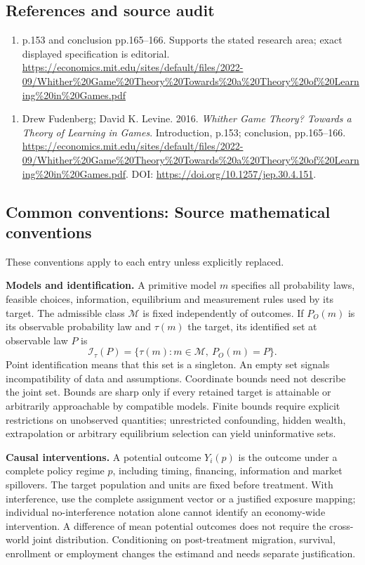 \documentclass[11pt,a4paper]{article}
\begin{document}
\subsection*{References and source audit}
\begin{enumerate}
\item p.153 and conclusion pp.165–166. Supports the stated research area; exact displayed specification is editorial. \url{https://economics.mit.edu/sites/default/files/2022-09/Whither%20Game%20Theory%20Towards%20a%20Theory%20of%20Learning%20in%20Games.pdf}
\end{enumerate}
\begin{enumerate}\raggedright
\item\hypertarget{definitions:source:30007565:1}{} Drew Fudenberg; David K. Levine. 2016. \emph{Whither Game Theory? Towards a Theory of Learning in Games}. Introduction, p.153; conclusion, pp.165–166.
\url{https://economics.mit.edu/sites/default/files/2022-09/Whither%20Game%20Theory%20Towards%20a%20Theory%20of%20Learning%20in%20Games.pdf}.
DOI: \url{https://doi.org/10.1257/jep.30.4.151}.
\end{enumerate}

\subsection*{Common conventions: Source mathematical conventions}

These conventions apply to each entry unless explicitly replaced.

\textbf{Models and identification.} A primitive model \(m\) specifies all probability laws, feasible choices, information, equilibrium and measurement rules used by its target. The admissible class \(\mathcal M\) is fixed independently of outcomes. If \(P_O(m)\) is its observable probability law and \(\tau(m)\) the target, its identified set at observable law \(P\) is
\[
 \mathcal I_\tau(P)=\{\tau(m):m\in\mathcal M,\ P_O(m)=P\}.
\]
Point identification means that this set is a singleton. An empty set signals incompatibility of data and assumptions. Coordinate bounds need not describe the joint set. Bounds are sharp only if every retained target is attainable or arbitrarily approachable by compatible models. Finite bounds require explicit restrictions on unobserved quantities; unrestricted confounding, hidden wealth, extrapolation or arbitrary equilibrium selection can yield uninformative sets.

\textbf{Causal interventions.} A potential outcome \(Y_i(p)\) is the outcome under a complete policy regime \(p\), including timing, financing, information and market spillovers. The target population and units are fixed before treatment. With interference, use the complete assignment vector or a justified exposure mapping; individual no-interference notation alone cannot identify an economy-wide intervention. A difference of mean potential outcomes does not require the cross-world joint distribution. Conditioning on post-treatment migration, survival, enrollment or employment changes the estimand and needs separate justification.
\end{document}
